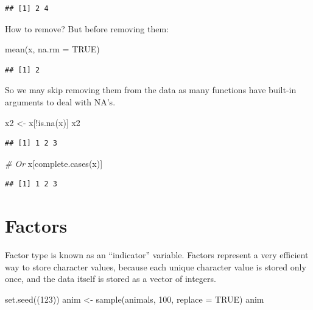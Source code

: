 \documentclass[
]{book}
\newenvironment{Shaded}{\begin{snugshade}}{\end{snugshade}}
\newcommand{\AttributeTok}[1]{\textcolor[rgb]{0.77,0.63,0.00}{#1}}
\newcommand{\CommentTok}[1]{\textcolor[rgb]{0.56,0.35,0.01}{\textit{#1}}}
\newcommand{\ConstantTok}[1]{\textcolor[rgb]{0.00,0.00,0.00}{#1}}
\newcommand{\DecValTok}[1]{\textcolor[rgb]{0.00,0.00,0.81}{#1}}
\newcommand{\FunctionTok}[1]{\textcolor[rgb]{0.00,0.00,0.00}{#1}}
\newcommand{\NormalTok}[1]{#1}
\newcommand{\OtherTok}[1]{\textcolor[rgb]{0.56,0.35,0.01}{#1}}
\newcommand{\SpecialCharTok}[1]{\textcolor[rgb]{0.00,0.00,0.00}{#1}}
\begin{document}
\begin{verbatim}
## [1] 2 4
\end{verbatim}

How to remove? But before removing them:

\begin{Shaded}
\begin{Highlighting}[]
\FunctionTok{mean}\NormalTok{(x, }\AttributeTok{na.rm =} \ConstantTok{TRUE}\NormalTok{)}
\end{Highlighting}
\end{Shaded}

\begin{verbatim}
## [1] 2
\end{verbatim}

So we may skip removing them from the data as many functions have built-in arguments to deal with NA's.

\begin{Shaded}
\begin{Highlighting}[]
\NormalTok{x2 }\OtherTok{\textless{}{-}}\NormalTok{ x[}\SpecialCharTok{!}\FunctionTok{is.na}\NormalTok{(x)]}
\NormalTok{x2}
\end{Highlighting}
\end{Shaded}

\begin{verbatim}
## [1] 1 2 3
\end{verbatim}

\begin{Shaded}
\begin{Highlighting}[]
\CommentTok{\# Or}
\NormalTok{x[}\FunctionTok{complete.cases}\NormalTok{(x)]}
\end{Highlighting}
\end{Shaded}

\begin{verbatim}
## [1] 1 2 3
\end{verbatim}

\hypertarget{factors}{%
\section{Factors}\label{factors}}

Factor type is known as an ``indicator'' variable. Factors represent a very efficient way to store character values, because each unique character value is stored only once, and the data itself is stored as a vector of integers.

\begin{Shaded}
\begin{Highlighting}[]
\FunctionTok{set.seed}\NormalTok{((}\DecValTok{123}\NormalTok{))}
\NormalTok{anim }\OtherTok{\textless{}{-}} \FunctionTok{sample}\NormalTok{(animals, }\DecValTok{100}\NormalTok{, }\AttributeTok{replace =} \ConstantTok{TRUE}\NormalTok{)}
\NormalTok{anim}
\end{Highlighting}
\end{Shaded}
\end{document}
